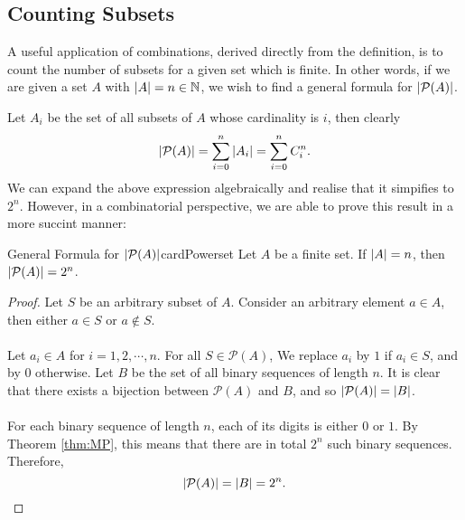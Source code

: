 \documentclass[math]{amznotes}
\theoremstyle{remark}
\begin{document}
\subsection{Counting Subsets}
A useful application of combinations, derived directly from the definition, is to count the number of subsets for a given set which is finite. In other words, if we are given a set $A$ with ${\left\lvert {A} \right\rvert} = n \in \mathbb{N}$, we wish to find a general formula for ${\left\lvert {\mathcal{P}(A)} \right\rvert}$.

Let $A_i$ be the set of all subsets of $A$ whose cardinality is $i$, then clearly
\begin{equation*}
    {\left\lvert {\mathcal{P}(A)} \right\rvert} = \sum_{i = 0}^{n}{\left\lvert {A_i} \right\rvert} = \sum_{i = 0}^{n}C^n_i.
\end{equation*}
We can expand the above expression algebraically and realise that it simpifies to $2^n$. However, in a combinatorial perspective, we are able to prove this result in a more succint manner:
\begin{thmbox}{General Formula for ${\left\lvert {\mathcal{P}(A)} \right\rvert}$}{cardPowerset}
    Let $A$ be a finite set. If ${\left\lvert {A} \right\rvert} = n$, then ${\left\lvert {\mathcal{P}(A)} \right\rvert} = 2^n$.
    \tcblower
    \begin{proof}
        Let $S$ be an arbitrary subset of $A$. Consider an arbitrary element $a \in A$, then either $a \in S$ or $a \notin S$. 
        \\\\
        Let $a_i \in A$ for $i = 1, 2, \cdots, n$. For all $S \in \mathcal{P}(A)$, We replace $a_i$ by $1$ if $a_i \in S$, and by $0$ otherwise. Let $B$ be the set of all binary sequences of length $n$. It is clear that there exists a bijection between $\mathcal{P}(A)$ and $B$, and so ${\left\lvert {\mathcal{P}(A)} \right\rvert} = {\left\lvert {B} \right\rvert}$.
        \\\\
        For each binary sequence of length $n$, each of its digits is either $0$ or $1$. By Theorem \ref{thm:MP}, this means that there are in total $2^n$ such binary sequences. Therefore,
        \begin{equation*}
            {\left\lvert {\mathcal{P}(A)} \right\rvert} = {\left\lvert {B} \right\rvert} = 2^n.
        \end{equation*}
    \end{proof}
\end{thmbox}
\end{document}
